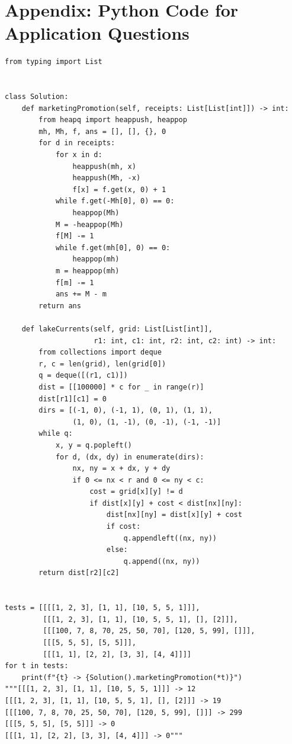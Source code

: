 \documentclass[12pt]{article}
\begin{document}
\section*{Appendix: Python Code for Application Questions}
\begin{verbatim}
from typing import List


class Solution:
    def marketingPromotion(self, receipts: List[List[int]]) -> int:
        from heapq import heappush, heappop
        mh, Mh, f, ans = [], [], {}, 0
        for d in receipts:
            for x in d:
                heappush(mh, x)
                heappush(Mh, -x)
                f[x] = f.get(x, 0) + 1
            while f.get(-Mh[0], 0) == 0:
                heappop(Mh)
            M = -heappop(Mh)
            f[M] -= 1
            while f.get(mh[0], 0) == 0:
                heappop(mh)
            m = heappop(mh)
            f[m] -= 1
            ans += M - m
        return ans

    def lakeCurrents(self, grid: List[List[int]],
                     r1: int, c1: int, r2: int, c2: int) -> int:
        from collections import deque
        r, c = len(grid), len(grid[0])
        q = deque([(r1, c1)])
        dist = [[100000] * c for _ in range(r)]
        dist[r1][c1] = 0
        dirs = [(-1, 0), (-1, 1), (0, 1), (1, 1),
                (1, 0), (1, -1), (0, -1), (-1, -1)]
        while q:
            x, y = q.popleft()
            for d, (dx, dy) in enumerate(dirs):
                nx, ny = x + dx, y + dy
                if 0 <= nx < r and 0 <= ny < c:
                    cost = grid[x][y] != d
                    if dist[x][y] + cost < dist[nx][ny]:
                        dist[nx][ny] = dist[x][y] + cost
                        if cost:
                            q.appendleft((nx, ny))
                        else:
                            q.append((nx, ny))
        return dist[r2][c2]


tests = [[[[1, 2, 3], [1, 1], [10, 5, 5, 1]]],
         [[[1, 2, 3], [1, 1], [10, 5, 5, 1], [], [2]]],
         [[[100, 7, 8, 70, 25, 50, 70], [120, 5, 99], []]],
         [[[5, 5, 5], [5, 5]]],
         [[[1, 1], [2, 2], [3, 3], [4, 4]]]]
for t in tests:
    print(f"{t} -> {Solution().marketingPromotion(*t)}")
"""[[[1, 2, 3], [1, 1], [10, 5, 5, 1]]] -> 12
[[[1, 2, 3], [1, 1], [10, 5, 5, 1], [], [2]]] -> 19
[[[100, 7, 8, 70, 25, 50, 70], [120, 5, 99], []]] -> 299
[[[5, 5, 5], [5, 5]]] -> 0
[[[1, 1], [2, 2], [3, 3], [4, 4]]] -> 0"""


\end{verbatim}
\end{document}

